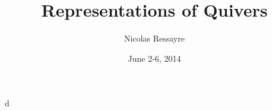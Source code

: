 \documentclass{article}
\title{Representations of Quivers}
\author{Nicolas Ressayre}
\date{June 2-6, 2014}
\begin{document}
\maketitle





d
\end{document}
